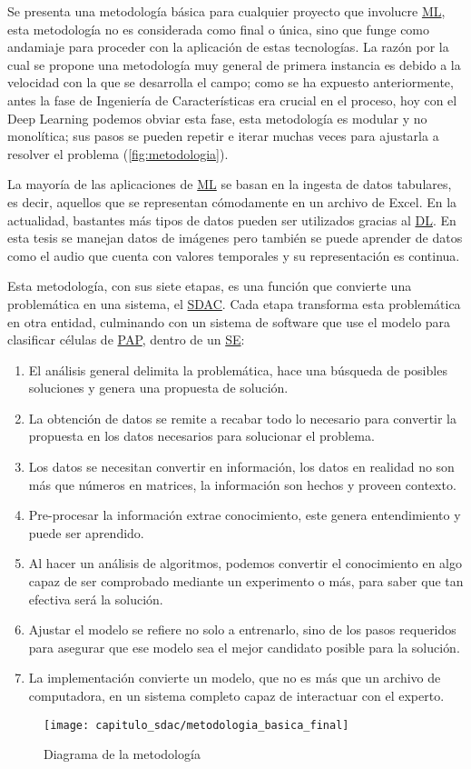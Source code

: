 Se presenta una metodología básica para cualquier proyecto que involucre \hyperlink{abbr}{ML},
esta metodología no es considerada como final o única, sino que funge como
andamiaje para proceder con la aplicación de estas tecnologías. La razón por la
cual se propone una metodología muy general de primera instancia es debido a la
velocidad con la que se desarrolla el campo; como se ha expuesto anteriormente,
antes la fase de Ingeniería de Características era crucial en el proceso, hoy
con el Deep Learning podemos obviar esta fase, esta metodología es modular y no
monolítica; sus pasos se pueden repetir e iterar muchas veces para ajustarla a
resolver el problema (\autoref{fig:metodologia}).

La mayoría de las aplicaciones de \hyperlink{abbr}{ML} se basan en la ingesta de
datos tabulares, es decir, aquellos que se representan cómodamente en un archivo
de Excel. En la actualidad, bastantes más tipos de datos pueden ser utilizados
gracias al \hyperlink{abbr}{DL}. En esta tesis se manejan datos de imágenes pero
también se puede aprender de datos como el audio que cuenta con valores
temporales y su representación es continua.

Esta metodología, con sus siete etapas, es una función que convierte una
problemática en una sistema, el \hyperlink{abbr}{SDAC}. Cada etapa transforma
esta problemática en otra entidad, culminando con un sistema de software que use
el modelo para clasificar células de \hyperlink{abbr}{PAP}, dentro de un
\hyperlink{abbr}{SE}\cite{AurelienGeron2017}:

\begin{enumerate}
    \item El análisis general delimita la problemática, hace una búsqueda de posibles soluciones
    y genera una propuesta de solución.
    \item La obtención de datos se remite a recabar todo lo necesario para convertir la
    propuesta en los datos necesarios para solucionar el problema.
    \item Los datos se necesitan convertir en información, los datos en realidad no son más
    que números en matrices, la información son hechos y proveen contexto.
    \item Pre-procesar la información extrae conocimiento, este genera entendimiento y puede
    ser aprendido.
    \item Al hacer un análisis de algoritmos, podemos convertir el conocimiento
    en algo capaz de ser comprobado mediante un experimento o más, para saber
    que tan efectiva será la solución.
    \item Ajustar el modelo se refiere no solo a entrenarlo, sino de los
    pasos requeridos para asegurar que ese modelo sea el mejor candidato posible
    para la solución.
    \item La implementación convierte un modelo, que no es más que un archivo de computadora,
    en un sistema completo capaz de interactuar con el experto.
\end{enumerate}

\begin{figure}[H]
    \centering
    \texttt{[image: capitulo\_sdac/metodologia\_basica\_final]}
    \caption{Diagrama de la metodología}\label{fig:metodologia}
\end{figure}